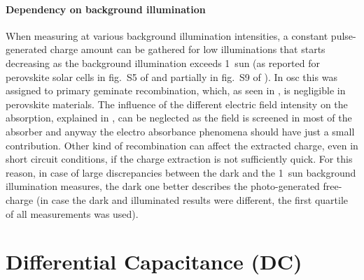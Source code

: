 	\paragraph{Dependency on background illumination}\label{tpc_intensity}
	When measuring  at various background illumination intensities, a constant pulse-generated charge amount can be gathered for low illuminations that starts decreasing as the background illumination exceeds \SI{1}{sun} (as reported for perovskite solar cells in fig.~S5 of \cite{Du2018} and partially in fig.~S9 of \cite{Wheeler2017}).
	In \gls{osc} this was assigned to primary geminate recombination, which, as seen in , is negligible in perovskite materials.
	The influence of the different electric field intensity on the absorption, explained in , can be neglected as the field is screened in most of the absorber and anyway the electro absorbance phenomena should have just a small contribution.
	Other kind of recombination can affect the extracted charge, even in short circuit conditions, if the charge extraction is not sufficiently quick.
	For this reason, in case of large discrepancies between the dark and the \SI{1}{sun} background illumination measures, the dark one better describes the photo-generated free-charge (in case the dark and illuminated results were different, the first quartile of all  measurements was used).

\section{Differential Capacitance (DC)}


